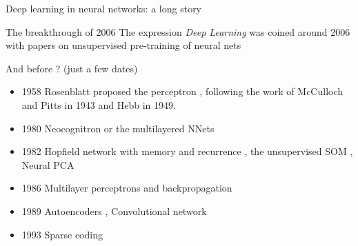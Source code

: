 \begin{frame}{Deep learning in neural networks: a  long story}
   \begin{block}{The breakthrough of 2006}
     The expression \emph{Deep Learning} was coined around 2006 with papers on unsupervised pre-training of neural nets~\cite{Hinton06Deep,Hinton06Science,Bengio07Greedy}
   \end{block}
   \begin{block}{And before ? (just a few dates)}
     \begin{itemize}
     \item 1958 Rosenblatt proposed the perceptron \cite{Rosenblatt58Perceptron}, following the work of McCulloch and Pitts in 1943 and Hebb in 1949. 
     \item 1980 Neocognitron \cite{Fukushima80Neocognitron} or the multilayered NNets
     \item 1982 Hopfield network with memory and recurrence \cite{Hopfield82Neural}, the unsupervised SOM \cite{Kohonen82SOM}, Neural PCA \cite{Oja82NeuralPCA}
     \item 1986 Multilayer perceptrons and backpropagation \cite{Rumelhart86BP}
     \item 1989 Autoencoders \cite{Baldi89AE}, Convolutional network \cite{LeCun89}
     \item 1993 Sparse coding \cite{Field93Sparse}
     \end{itemize}
   \end{block}
\end{frame}


